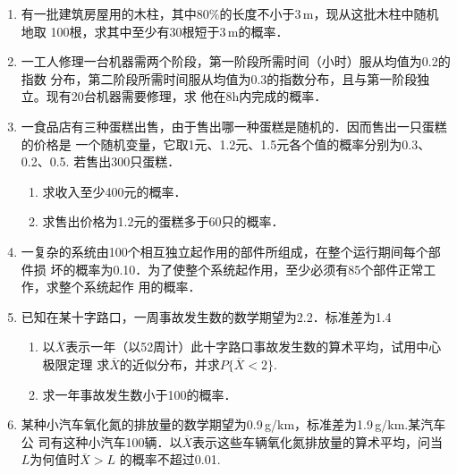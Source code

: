\documentclass[10pt,a4paper]{article}
\begin{document}
\begin{enumerate}
    \item 有一批建筑房屋用的木柱，其中80\%的长度不小于3$\, $m，现从这批木柱中随机地取
    100根，求其中至少有30根短于3$\, $m的概率．
    \vspace{11cm}


    \item 一工人修理一台机器需两个阶段，第一阶段所需时间（小时）服从均值为0.2的指数
    分布，第二阶段所需时间服从均值为0.3的指数分布，且与第一阶段独立。现有20台机器需要修理，求
    他在8h内完成的概率．
    \vspace{11cm}



    \item 一食品店有三种蛋糕出售，由于售出哪一种蛋糕是随机的．因而售出一只蛋糕的价格是
    一个随机变量，它取1元、1.2元、1.5元各个值的概率分别为0.3、0.2、0.5. 若售出300只蛋糕．
    \begin{enumerate}
        \item 求收入至少400元的概率．
        \item 求售出价格为1.2元的蛋糕多于60只的概率．
    \end{enumerate}
    \vspace{10cm}



    \item 一复杂的系统由100个相互独立起作用的部件所组成，在整个运行期间每个部件损
    坏的概率为0.10．为了使整个系统起作用，至少必须有85个部件正常工作，求整个系统起作
    用的概率．
    \vspace{10cm}



    \item 已知在某十字路口，一周事故发生数的数学期望为2.2．标准差为1.4
    \begin{enumerate}
        \item 以$\overline{X}$表示一年（以52周计）此十字路口事故发生数的算术平均，试用中心极限定理
        求$\overline{X}$的近似分布，并求$P\{\overline{X}<2\}$.
        \item 求一年事故发生数小于100的概率．
    \end{enumerate}
    \vspace{10cm}





    \item 某种小汽车氧化氮的排放量的数学期望为0.9$\, $g/km，标准差为1.9$\, $g/km.某汽车公
    司有这种小汽车100辆．以$\overline{X}$表示这些车辆氧化氮排放量的算术平均，问当$L$为何值时$\overline{X}>L$
    的概率不超过0.01.
    \vspace{10cm}




\end{enumerate}
\end{document}
